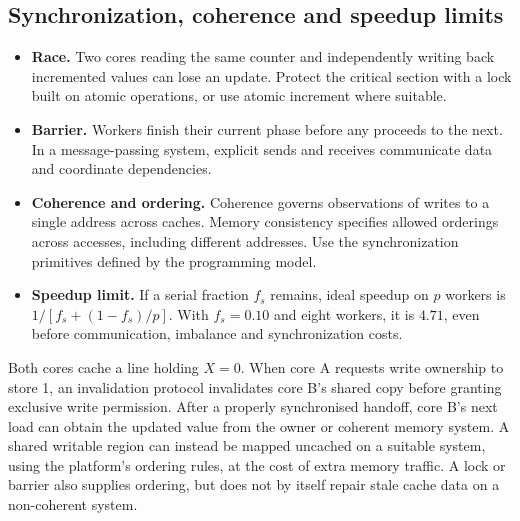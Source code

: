 \documentclass[12pt,a4paper]{article}
\begin{document}
\subsection{Synchronization, coherence and speedup limits}
\begin{itemize}[leftmargin=*,itemsep=3pt]
\item \textbf{Race.} Two cores reading the same counter and independently writing back incremented values can lose an update. Protect the critical section with a lock built on atomic operations, or use atomic increment where suitable.
\item \textbf{Barrier.} Workers finish their current phase before any proceeds to the next. In a message-passing system, explicit sends and receives communicate data and coordinate dependencies.
\item \textbf{Coherence and ordering.} Coherence governs observations of writes to a single address across caches. Memory consistency specifies allowed orderings across accesses, including different addresses. Use the synchronization primitives defined by the programming model.
\item \textbf{Speedup limit.} If a serial fraction $f_s$ remains, ideal speedup on $p$ workers is $1/[f_s+(1-f_s)/p]$. With $f_s=0.10$ and eight workers, it is $4.71$, even before communication, imbalance and synchronization costs.
\end{itemize}
\begin{tcolorbox}[examplebox,title={Follow a coherence invalidation}]
Both cores cache a line holding $X=0$. When core A requests write ownership to store 1, an invalidation protocol invalidates core B's shared copy before granting exclusive write permission. After a properly synchronised handoff, core B's next load can obtain the updated value from the owner or coherent memory system. A shared writable region can instead be mapped uncached on a suitable system, using the platform's ordering rules, at the cost of extra memory traffic. A lock or barrier also supplies ordering, but does not by itself repair stale cache data on a non-coherent system.
\end{tcolorbox}

\par
\ifdim\dimexpr\pagegoal-\pagetotal\relax<108pt\relax
  \newpage
\fi
\end{document}
